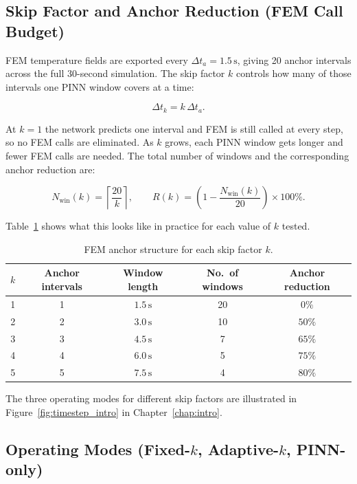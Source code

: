 \subsection{Skip Factor and Anchor Reduction (FEM Call Budget)}

FEM temperature fields are exported every $\Delta t_a = 1.5\,\mathrm{s}$,
giving 20 anchor intervals across the full 30-second simulation.
The skip factor $k$ controls how many of those intervals one PINN window
covers at a time:

\begin{equation}
\Delta t_k = k\,\Delta t_a.
\label{eq:dtk}
\end{equation}

At $k=1$ the network predicts one interval and FEM is still called at every
step, so no FEM calls are eliminated.
As $k$ grows, each PINN window gets longer and fewer FEM calls are needed.
The total number of windows and the corresponding anchor reduction are:

\begin{equation}
N_\mathrm{win}(k) = \left\lceil \frac{20}{k} \right\rceil, \qquad
R(k) = \left(1 - \frac{N_\mathrm{win}(k)}{20}\right)\times 100\%.
\label{eq:reduction}
\end{equation}

Table~\ref{tab:k_structure} shows what this looks like in practice for
each value of $k$ tested.

\begin{table}[H]
\centering
\caption{FEM anchor structure for each skip factor $k$.}
\label{tab:k_structure}
\begin{tabular}{ccccc}
\toprule
$k$ & Anchor intervals & Window length & No.\ of windows & Anchor reduction \\
\midrule
1 & 1 & $1.5\,\mathrm{s}$ & 20 & $0\%$ \\
2 & 2 & $3.0\,\mathrm{s}$ & 10 & $50\%$ \\
3 & 3 & $4.5\,\mathrm{s}$ &  7 & $65\%$ \\
4 & 4 & $6.0\,\mathrm{s}$ &  5 & $75\%$ \\
5 & 5 & $7.5\,\mathrm{s}$ &  4 & $80\%$ \\
\bottomrule
\end{tabular}
\end{table}

The three operating modes for different skip factors are illustrated in
Figure~\ref{fig:timestep_intro} in Chapter~\ref{chap:intro}.

\subsection{Operating Modes (Fixed-$k$, Adaptive-$k$, PINN-only)}
\label{subsec:adaptive_k}


